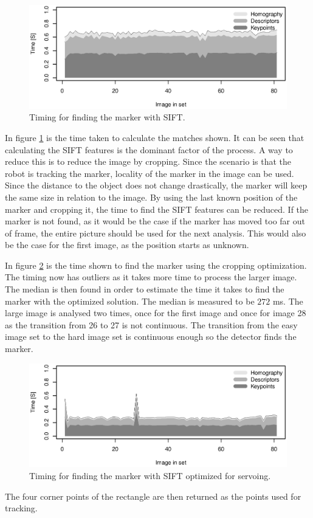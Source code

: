 \begin{figure}[h]
 \centering
 \includegraphics[width=\fullImageWidth]{graphics/marker3_timing_unoptimized}
 \caption{Timing for finding the marker with SIFT.}
 \label{fig:time_sift_unoptimized}
\end{figure}

In figure \ref{fig:time_sift_unoptimized} is the time taken to calculate the matches shown.
It can be seen that calculating the SIFT features is the dominant factor of the process.
A way to reduce this is to reduce the image by cropping.
Since the scenario is that the robot is tracking the marker, locality of the marker in the image can be used.
Since the distance to the object does not change drastically, the marker will keep the same size in relation to the image.
By using the last known position of the marker and cropping it, the time to find the SIFT features can be reduced.
If the marker is not found, as it would be the case if the marker has moved too far out of frame, the entire picture should be used for the next analysis.
This would also be the case for the first image, as the position starts as unknown.

In figure \ref{fig:time_sift_crop} is the time shown to find the marker using the cropping optimization.
The timing now has outliers as it takes more time to process the larger image.
The median is then found in order to estimate the time it takes to find the marker with the optimized solution.
The median is measured to be $272$ ms.
The large image is analysed two times, once for the first image and once for image 28 as the transition from 26 to 27 is not continuous.
The transition from the easy image set to the hard image set is continuous enough so the detector finds the marker.

\begin{figure}[h]
 \centering
 \includegraphics[width=\fullImageWidth]{graphics/marker3_timing_crop}
 \caption{Timing for finding the marker with SIFT optimized for servoing.}
 \label{fig:time_sift_crop}
\end{figure}

The four corner points of the rectangle are then returned as the points used for tracking.
